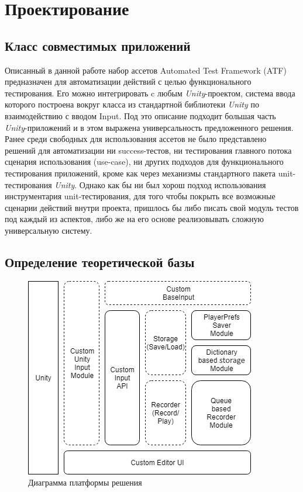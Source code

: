 \chapter{Проектирование}
\label{cha:ch_1}

\section{Класс совместимых приложений}
Описанный в данной работе набор ассетов Automated Test Framework (ATF) предназначен для автоматизации действий с целью функционального тестирования. Его можно интегрировать c любым  \textit{Unity}-проектом, система ввода которого построена вокруг класса из стандартной библиотеки \textit{Unity} по взаимодействию с вводом Input. Под это описание подходит большая часть \textit{Unity}-приложений и в этом выражена универсальность предложенного решения. Ранее среди свободных для использования ассетов не было представлено решений для автоматизации ни success-тестов, ни тестирования главного потока сценария использования (use-case), ни других подходов для функционального тестирования приложений, кроме как через механизмы стандартного пакета unit-тестирования \textit{Unity}. Однако как бы ни был хорош подход использования инструментария unit-тестирования, для того чтобы покрыть все возможные сценарии действий внутри проекта, пришлось бы либо писать свой модуль тестов под каждый из аспектов, либо же на его основе реализовывать сложную универсальную систему.

\section{Определение теоретической базы}
\begin{figure}[H]
	\centering
	\includegraphics[width=0.5\linewidth]{platform.png}
	\caption{Диаграмма платформы решения}
	\label{platform}
\end{figure}

